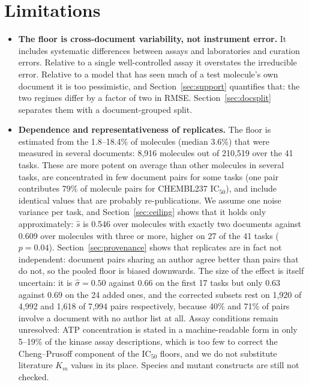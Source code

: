 \section{Limitations}\label{sec:limits}
{\sloppy
\begin{itemize}
\item \textbf{The floor is cross-document variability, not instrument error.} It includes systematic differences between assays and laboratories and curation errors. Relative to a single well-controlled assay it overstates the irreducible error. Relative to a model that has seen much of a test molecule's own document it is too pessimistic, and Section~\ref{sec:support} quantifies that: the two regimes differ by a factor of two in RMSE. Section~\ref{sec:docsplit} separates them with a document-grouped split.
\item \textbf{Dependence and representativeness of replicates.} The floor is estimated from the 1.8--18.4\% of molecules (median 3.6\%) that were measured in several documents: 8{,}916 molecules out of 210{,}519 over the 41 tasks. These are more potent on average than other molecules in several tasks, are concentrated in few document pairs for some tasks (one pair contributes 79\% of molecule pairs for CHEMBL237 $\mathrm{IC}_{50}$), and include identical values that are probably re-publications. We assume one noise variance per task, and Section~\ref{sec:ceiling} shows that it holds only approximately: $\hat s$ is 0.546 over molecules with exactly two documents against 0.609 over molecules with three or more, higher on 27 of the 41 tasks ($p=0.04$). Section~\ref{sec:provenance} shows that replicates are in fact not independent: document pairs sharing an author agree better than pairs that do not, so the pooled floor is biased downwards. The size of the effect is itself uncertain: it is $\hat\sigma=0.50$ against $0.66$ on the first 17 tasks but only 0.63 against 0.69 on the 24 added ones, and the corrected subsets rest on 1{,}920 of 4{,}992 and 1{,}618 of 7{,}994 pairs respectively, because 40\% and 71\% of pairs involve a document with no author list at all. Assay conditions remain unresolved: ATP concentration is stated in a machine-readable form in only 5--19\% of the kinase assay descriptions, which is too few to correct the Cheng--Prusoff component of the $\mathrm{IC}_{50}$ floors, and we do not substitute literature $K_m$ values in its place. Species and mutant constructs are still not checked.

\end{itemize}}
